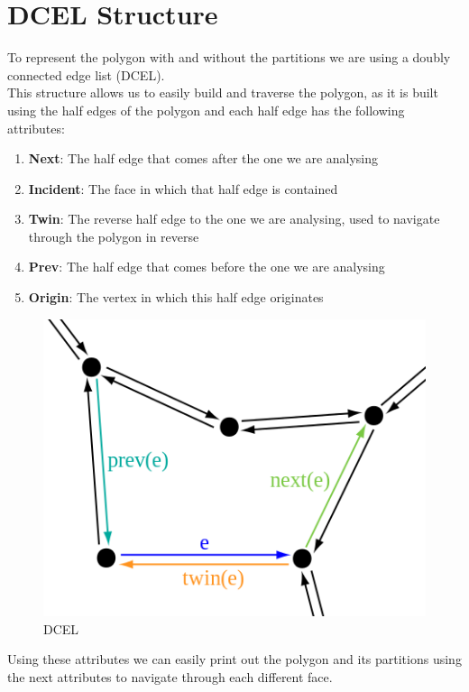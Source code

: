 \documentclass[12pt,a4paper,oneside]{article}
\begin{document}
\section{DCEL Structure}
To represent the polygon with and without the partitions we are using a doubly connected edge list (DCEL).\\
This structure allows us to easily build and traverse the polygon, as it is built using the half edges of the polygon and each half edge has the following attributes:

\begin{enumerate}  
\item \textbf{Next}: The half edge that comes after the one we are analysing
\item \textbf{Incident}: The face in which that half edge is contained
\item \textbf{Twin}: The reverse half edge to the one we are analysing, used to navigate through the polygon in reverse
\item \textbf{Prev}: The half edge that comes before the one we are analysing
\item \textbf{Origin}: The vertex in which this half edge originates
\end{enumerate}

\begin{figure}[h!]
  \centering \includegraphics[scale=0.5]{dcel.png}
  \caption{DCEL}
  \label{fig:Dcel}
\end{figure}


Using these attributes we can easily print out the polygon and its partitions using the next attributes to navigate through each different face.
\end{document}
